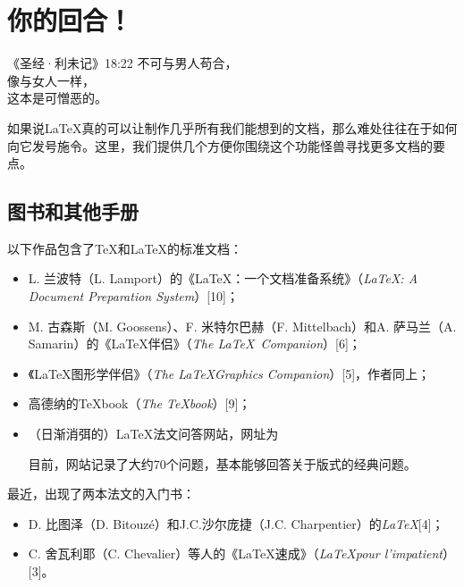 \chapter{你的回合！}

\begin{epigraphe}{《圣经·利未记》18:22}
    不可与男人苟合，\\像与女人一样，\\这本是可憎恶的。
\end{epigraphe}

如果说\LaTeX 真的可以让制作几乎所有我们能想到的文档，那么难处往往在于如何向它发号施令。这里，我们提供几个方便你围绕这个功能怪兽寻找更多文档的要点。

\section{图书和其他手册}

以下作品包含了\TeX 和\LaTeX 的标准文档：

\begin{itemize}
    \item L. 兰波特（L. Lamport）的《\LaTeX ：一个文档准备系统》（\emph{\LaTeX : A Document Preparation System}）[10]；
    \item M. 古森斯（M. Goossens）、F. 米特尔巴赫（F. Mittelbach）和A. 萨马兰（A. Samarin）的《\LaTeX 伴侣》（\emph{The \LaTeX \ Companion}）[6]；
    \item 《\LaTeX 图形学伴侣》（\emph{The \LaTeX  Graphics Companion}）[5]，作者同上；
    \item 高德纳的\TeX book（\emph{The \TeX book}）[9]；
    \item （日渐消弭的）\LaTeX 法文问答网站，网址为
    
    \begin{center}
    \end{center}

    目前，网站记录了大约70个问题，基本能够回答关于版式的经典问题。
\end{itemize}

最近，出现了两本法文的入门书：

\begin{itemize}
    \item D. 比图泽（D. Bitouzé）和J.C.沙尔庞捷（J.C. Charpentier）的\emph{\LaTeX }[4]；
    \item C. 舍瓦利耶（C. Chevalier）等人的《\LaTeX 速成》（\emph{\LaTeX  pour l'impatient}）[3]。
\end{itemize}

